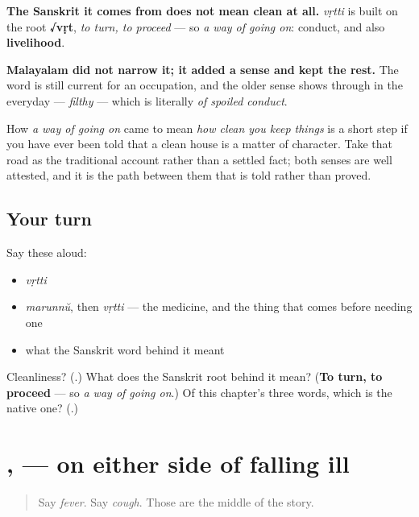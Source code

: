 \begin{culture}
\textbf{The Sanskrit it comes from does not mean clean at all.} \emph{vṛtti} is built on the root \textbf{√vṛt}, \emph{to turn, to proceed} — so \emph{a way of going on}: conduct, and also \textbf{livelihood}.

\textbf{Malayalam did not narrow it; it added a sense and kept the rest.} The word is still current for an occupation, and the older sense shows through in the everyday \textbf{} — \emph{filthy} — which is literally \emph{of spoiled conduct}.

How \emph{a way of going on} came to mean \emph{how clean you keep things} is a short step if you have ever been told that a clean house is a matter of character. Take that road as the traditional account rather than a settled fact; both senses are well attested, and it is the path between them that is told rather than proved.
\end{culture}

\subsection*{Your turn}
Say these aloud:

\begin{itemize}
\raggedright
  \item \emph{vṛtti}
  \item \emph{marunnŭ}, then \emph{vṛtti} — the medicine, and the thing that comes before needing one
  \item what the Sanskrit word behind it meant
\end{itemize}

\begin{tcolorbox}[breakable,colback=teal!4,colframe=teal!35!black,title={Before you move on}]
Cleanliness? (\textbf{}.) What does the Sanskrit root behind it mean? (\textbf{To turn, to proceed} — so \emph{a way of going on}.) Of this chapter's three words, which is the native one? (\textbf{}.)
\end{tcolorbox}
\section[Practice]{,  — on either side of falling ill}

\label{lesson:ML-C107-before-and-after}



\begin{quote}
Say \emph{fever}. Say \emph{cough}. Those are the middle of the story.
\end{quote}

